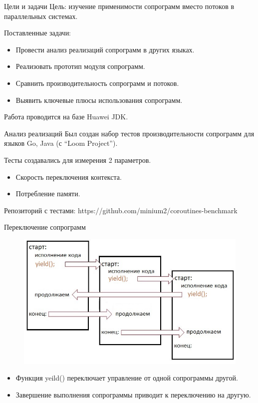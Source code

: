\begin{frame}{Цели и задачи}
	Цель: изучение применимости сопрограмм вместо потоков в параллельных системах.
	\par
	Поставленные задачи:
	\begin{itemize}
		\item Провести анализ реализаций сопрограмм в других языках.
		\item Реализовать прототип модуля сопрограмм.
		\item Сравнить производительность сопрограмм и потоков.
		\item Выявить ключевые плюсы использования сопрограмм.
	\end{itemize}
	Работа проводится на базе Huawei JDK.
\end{frame} 

\begin{frame}{Анализ реализаций}
	Был создан набор тестов производительности сопрограмм для языков Go, Java (с “Loom Project”).
	
	Тесты создавались для измерения 2 параметров.
	\begin{itemize}
		\item Скорость переключения контекста.
		\item Потребление памяти.
	\end{itemize}
	Репозиторий с тестами: https://github.com/minium2/coroutines-benchmark
\end{frame}

\begin{frame}{Переключение сопрограмм}
	\begin{figure}
		\includegraphics[scale=0.5]{images/scheme.jpg}
	\end{figure}
	\par
	\begin{itemize}
		\item Функция yeild() переключает управление от одной сопрограммы другой.
		\item Завершение выполнения сопрограммы приводит к переключению на другую.
	\end{itemize}
\end{frame}

